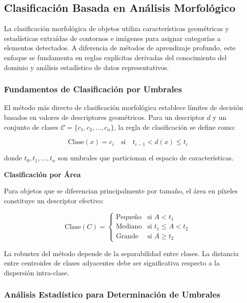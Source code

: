\subsection{Clasificación Basada en Análisis Morfológico}

La clasificación morfológica de objetos utiliza características geométricas y estadísticas extraídas de contornos e imágenes para asignar categorías a elementos detectados. A diferencia de métodos de aprendizaje profundo, este enfoque se fundamenta en reglas explícitas derivadas del conocimiento del dominio y análisis estadístico de datos representativos.

\subsubsection{Fundamentos de Clasificación por Umbrales}

El método más directo de clasificación morfológica establece límites de decisión basados en valores de descriptores geométricos. Para un descriptor $d$ y un conjunto de clases $\mathcal{C} = \{c_1, c_2, ..., c_n\}$, la regla de clasificación se define como:

\begin{equation}
\text{Clase}(x) = c_i \quad \text{si} \quad t_{i-1} < d(x) \leq t_i
\end{equation}

donde $t_0, t_1, ..., t_n$ son umbrales que particionan el espacio de características.

\textbf{Clasificación por Área}

Para objetos que se diferencian principalmente por tamaño, el área en píxeles constituye un descriptor efectivo:

\begin{equation}
\text{Clase}(C) = \begin{cases}
\text{Pequeño} & \text{si } A < t_1 \\
\text{Mediano} & \text{si } t_1 \leq A < t_2 \\
\text{Grande} & \text{si } A \geq t_2
\end{cases}
\end{equation}

La robustez del método depende de la separabilidad entre clases. La distancia entre centroides de clases adyacentes debe ser significativa respecto a la dispersión intra-clase.

\subsubsection{Análisis Estadístico para Determinación de Umbrales}

